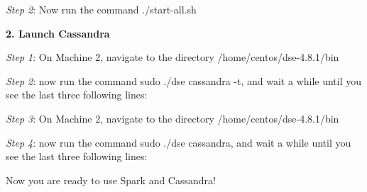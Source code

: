 \documentclass[letterpaper,12pt,english]{sphinxmanual}
\begin{document}
\begin{DUlineblock}{0em}
\item[] \emph{Step 2}: Now run the command ./start-all.sh
\end{DUlineblock}

\textbf{2. Launch Cassandra}

\begin{DUlineblock}{0em}
\item[] \emph{Step 1}: On Machine 2, navigate to the directory /home/centos/dse-4.8.1/bin
\end{DUlineblock}

\begin{DUlineblock}{0em}
\item[] \emph{Step 2}: now run the command sudo ./dse cassandra -t, and wait a while until you see the last three following lines:
\end{DUlineblock}

\begin{DUlineblock}{0em}
\item[] 
\item[] 
\item[] 
\end{DUlineblock}

\begin{DUlineblock}{0em}
\item[] \emph{Step 3}: On Machine 2, navigate to the directory /home/centos/dse-4.8.1/bin
\end{DUlineblock}

\begin{DUlineblock}{0em}
\item[] \emph{Step 4}: now run the command sudo ./dse cassandra, and wait a while until you see the last three following lines:
\end{DUlineblock}

\begin{DUlineblock}{0em}
\item[] 
\item[] 
\item[] 
\end{DUlineblock}

\begin{DUlineblock}{0em}
\item[] Now you are ready to use Spark and Cassandra!
\end{DUlineblock}
\end{document}
